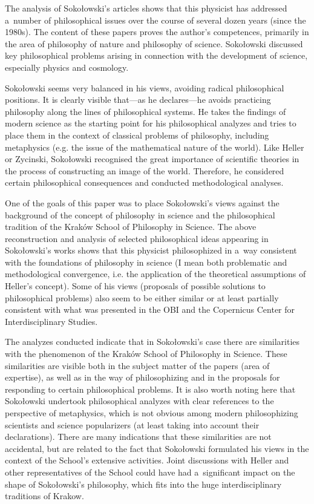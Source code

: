 \documentclass[%
  manuscript=article,
  year=2024,
  volume=77,
  doi=00000.000,
]{zfn}
\begin{document}
The analysis of Sokołowski's articles shows that this physicist has addressed a~number of philosophical issues over the course of several dozen years (since the 1980s). The content of these papers proves the author's competences, primarily in the area of philosophy of nature and philosophy of science. Sokołowski discussed key philosophical problems arising in connection with the development of science, especially physics and cosmology.



Sokołowski seems very balanced in his views, avoiding radical philosophical positions. It is clearly visible that---as he declares---he avoids practicing philosophy along the lines of philosophical systems. He takes the findings of modern science as the starting point for his philosophical analyzes and tries to place them in the context of classical problems of philosophy, including metaphysics (e.g. the issue of the mathematical nature of the world). Like Heller or Zycinski, Sokołowski recognised the great importance of scientific theories in the process of constructing an image of the world. Therefore, he considered certain philosophical consequences and conducted methodological analyses.



One of the goals of this paper was to place Sokołowski's views against the background of the concept of philosophy in science and the philosophical tradition of the Kraków School of Philosophy in Science. The above reconstruction and analysis of selected philosophical ideas appearing in Sokołowski's works shows that this physicist philosophized in a~way consistent with the foundations of philosophy in science (I mean both problematic and methodological convergence, i.e. the application of the theoretical assumptions of Heller's concept). Some of his views (proposals of possible solutions to philosophical problems) also seem to be either similar or at least partially consistent with what was presented in the OBI and the Copernicus Center for Interdisciplinary Studies.



The analyzes conducted indicate that in Sokołowski's case there are similarities with the phenomenon of the Kraków School of Philosophy in Science. These similarities are visible both in the subject matter of the papers (area of expertise), as well as in the way of philosophizing and in the proposals for responding to certain philosophical problems. It is also worth noting here that Sokołowski undertook philosophical analyzes with clear references to the perspective of metaphysics, which is not obvious among modern philosophizing scientists and science popularizers (at least taking into account their declarations). There are many indications that these similarities are not accidental, but are related to the fact that Sokołowski formulated his views in the context of the School's extensive activities. Joint discussions with Heller and other representatives of the School could have had a~significant impact on the shape of Sokołowski's philosophy, which fits into the huge interdisciplinary traditions of Krakow.
\end{document}
